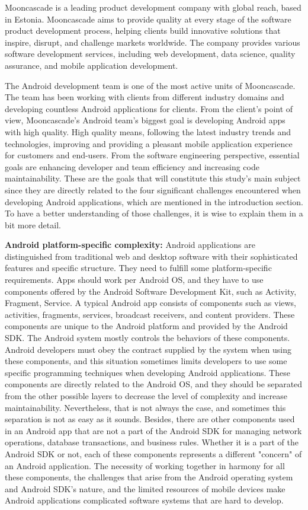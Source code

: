 Mooncascade is a leading product development company with global reach, based in Estonia. Mooncascade aims to provide quality at every stage of the software product development process, helping clients build innovative solutions that inspire, disrupt, and challenge markets worldwide. The company provides various software development services, including web development, data science, quality assurance, and mobile application development. 

The Android development team is one of the most active units of Mooncascade. The team has been working with clients from different industry domains and developing countless Android applications for clients. From the client's point of view, Mooncascade's Android team's biggest goal is developing Android apps with high quality. High quality means, following the latest industry trends and technologies, improving and providing a pleasant mobile application experience for customers and end-users. From the software engineering perspective, essential goals are enhancing developer and team efficiency and increasing code maintainability. These are the goals that will constitute this study's main subject since they are directly related to the four significant challenges encountered when developing Android applications, which are mentioned in the introduction section. To have a better understanding of those challenges, it is wise to explain them in a bit more detail. 

\noindent\textbf{Android platform-specific complexity:} Android applications are distinguished from traditional web and desktop software with their sophisticated features and specific structure. They need to fulfill some platform-specific requirements. Apps should work per Android OS, and they have to use components offered by the Android Software Development Kit, such as Activity, Fragment, Service. A typical Android app consists of components such as views, activities, fragments, services, broadcast receivers, and content providers. These components are unique to the Android platform and provided by the Android SDK. The Android system mostly controls the behaviors of these components. Android developers must obey the contract supplied by the system when using these components, and this situation sometimes limits developers to use some specific programming techniques when developing Android applications. These components are directly related to the Android OS, and they should be separated from the other possible layers to decrease the level of complexity and increase maintainability. Nevertheless, that is not always the case, and sometimes this separation is not as easy as it sounds. Besides, there are other components used in an Android app that are not a part of the Android SDK for managing network operations, database transactions, and business rules. Whether it is a part of the Android SDK or not, each of these components represents a different "concern" of an Android application. The necessity of working together in harmony for all these components, the challenges that arise from the Android operating system and Android SDK's nature, and the limited resources of mobile devices make Android applications complicated software systems that are hard to develop. 

